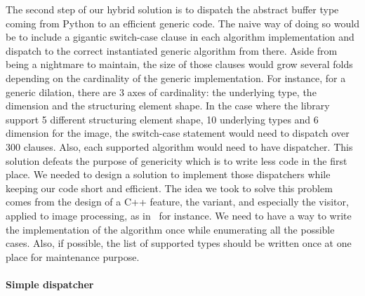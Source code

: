 The second step of our hybrid solution is to dispatch the abstract buffer type coming from Python to an efficient
generic code. The naive way of doing so would be to include a gigantic switch-case clause in each algorithm
implementation and dispatch to the correct instantiated generic algorithm from there. Aside from being a nightmare to
maintain, the size of those clauses would grow several folds depending on the cardinality of the generic implementation.
For instance, for a generic dilation, there are 3 axes of cardinality: the underlying type, the dimension and the
structuring element shape. In the case where the library support 5 different structuring element shape, 10 underlying
types and 6 dimension for the image, the switch-case statement would need to dispatch over 300 clauses. Also, each
supported algorithm would need to have dispatcher. This solution defeats the purpose of genericity which is to write
less code in the first place. We needed to design a solution to implement those dispatchers while keeping our code short
and efficient. The idea we took to solve this problem comes from the design of a C++ feature, the variant, and
especially the visitor, applied to image processing, as in~\parencite{bourdev.2011.runtimedispatch} for instance. We
need to have a way to write the implementation of the algorithm once while enumerating all the possible cases. Also, if
possible, the list of supported types should be written once at one place for maintenance purpose.


\paragraph{Simple dispatcher}

